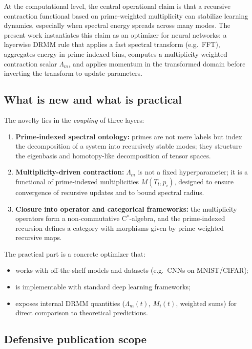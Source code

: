 \documentclass[11pt]{article}
\begin{document}
At the computational level, the central operational claim is that a recursive contraction functional based on prime-weighted multiplicity can stabilize learning dynamics, especially when spectral energy spreads across many modes. The present work instantiates this claim as an optimizer for neural networks: a layerwise DRMM rule that applies a fast spectral transform (e.g.\ FFT), aggregates energy in prime-indexed bins, computes a multiplicity-weighted contraction scalar $\Lambda_m$, and applies momentum in the transformed domain before inverting the transform to update parameters.

\subsection{What is new and what is practical}

The novelty lies in the \emph{coupling} of three layers:
\begin{enumerate}[label=(\alph*),leftmargin=*]
  \item \textbf{Prime-indexed spectral ontology:} primes are not mere labels but index the decomposition of a system into recursively stable modes; they structure the eigenbasis and homotopy-like decomposition of tensor spaces.
  \item \textbf{Multiplicity-driven contraction:} $\Lambda_m$ is not a fixed hyperparameter; it is a functional of prime-indexed multiplicities $M(T_t,p_i)$, designed to ensure convergence of recursive updates and to bound spectral radius.
  \item \textbf{Closure into operator and categorical frameworks:} the multiplicity operators form a non-commutative C$^*$-algebra, and the prime-indexed recursion defines a category with morphisms given by prime-weighted recursive maps.
\end{enumerate}

The practical part is a concrete optimizer that:
\begin{itemize}[leftmargin=*]
  \item works with off-the-shelf models and datasets (e.g.\ CNNs on MNIST/CIFAR);
  \item is implementable with standard deep learning frameworks;
  \item exposes internal DRMM quantities ($\Lambda_m(t)$, $M_i(t)$, weighted sums) for direct comparison to theoretical predictions.
\end{itemize}

\subsection{Defensive publication scope}
\end{document}

